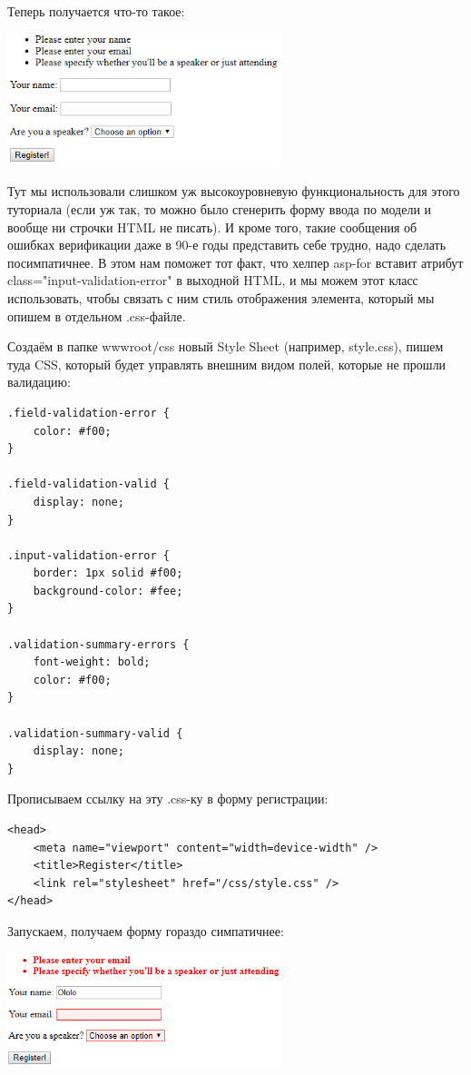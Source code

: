 \documentclass[a5paper]{article}
\begin{document}
Теперь получается что-то такое:

\begin{center}
	\includegraphics[width=0.6\textwidth]{validationError.png}
\end{center}

Тут мы использовали слишком уж высокоуровневую функциональность для этого туториала (если уж так, то можно было сгенерить форму ввода по модели и вообще ни строчки HTML не писать). И кроме того, такие сообщения об ошибках верификации даже в 90-е годы представить себе трудно, надо 
сделать посимпатичнее. В этом нам поможет тот факт, что хелпер asp-for вставит атрибут class="input-validation-error" в выходной HTML, и мы можем этот класс использовать, чтобы связать с ним стиль отображения элемента, который мы опишем в отдельном .css-файле.

Создаём в папке wwwroot/css новый Style Sheet (например, style.css), пишем туда CSS, который будет управлять внешним видом полей, которые не прошли валидацию:

\begin{verbatim}
.field-validation-error {
    color: #f00;
}

.field-validation-valid {
    display: none;
}

.input-validation-error {
    border: 1px solid #f00;
    background-color: #fee;
}

.validation-summary-errors {
    font-weight: bold;
    color: #f00;
}

.validation-summary-valid {
    display: none;
}
\end{verbatim}

Прописываем ссылку на эту .css-ку в форму регистрации:

\begin{verbatim}
<head>
    <meta name="viewport" content="width=device-width" />
    <title>Register</title>
    <link rel="stylesheet" href="/css/style.css" />
</head>
\end{verbatim}

Запускаем, получаем форму гораздо симпатичнее:

\begin{center}
	\includegraphics[width=0.6\textwidth]{validationErrorWithCss.png}
\end{center}
\end{document}
